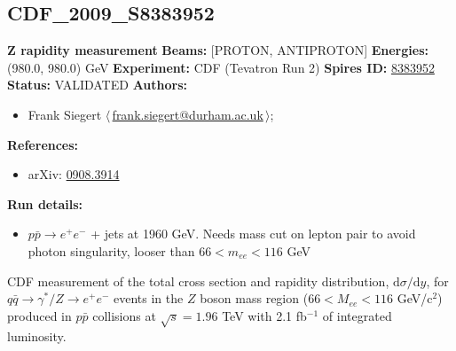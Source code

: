 \subsection[CDF\_2009\_S8383952]{CDF\_2009\_S8383952\,\cite{Aaltonen:2009pc}}
\textbf{Z rapidity measurement}\newline
\textbf{Beams:} [PROTON, ANTIPROTON] \newline
\textbf{Energies:} (980.0, 980.0) GeV \newline
\textbf{Experiment:} CDF (Tevatron Run 2) \newline
\textbf{Spires ID:} \href{http://www.slac.stanford.edu/spires/find/hep/www?rawcmd=key+8383952}{8383952}\newline
\textbf{Status:} VALIDATED\newline
\textbf{Authors:}
\begin{itemize}
  \item Frank Siegert $\langle\,$\href{mailto:frank.siegert@durham.ac.uk}{frank.siegert@durham.ac.uk}$\,\rangle$;
\end{itemize}
\textbf{References:}
\begin{itemize}
  \item arXiv: \href{http://arxiv.org/abs/0908.3914}{0908.3914}
\end{itemize}
\textbf{Run details:}
\begin{itemize}

  \item $p \bar{p} \to e^+ e^-$ + jets at 1960 GeV. Needs mass cut on lepton pair to avoid photon singularity, looser than $66 < m_{ee} < 116$ GeV\end{itemize}

\noindent CDF measurement of the total cross section and rapidity distribution, $\mathrm{d}\sigma/\mathrm{d}y$, for $q\bar{q}\to \gamma^{*}/Z\to e^{+}e^{-}$ events in the $Z$ boson mass region ($66<M_{ee}<116$ GeV/c$^2$) produced in $p\bar{p}$ collisions at $\sqrt{s}=1.96$ TeV with 2.1 fb$^{-1}$ of integrated luminosity.

\clearpage


\clearpage

